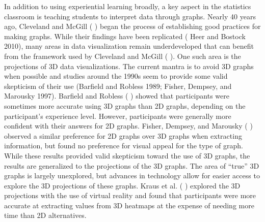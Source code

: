 \documentclass[
  12pt,
]{article}
\providecommand{\DIFdel}[1]{} %
\providecommand{\DIFadd}[1]{{\protect\color{blue} \sf #1}} %
\providecommand{\DIFdel}[1]{{\protect\color{red} [..\footnote{removed: #1} ]}} %
\providecommand{\DIFaddbegin}{} %
\providecommand{\DIFaddend}{} %
\providecommand{\DIFdelbegin}{} %
\providecommand{\DIFdelend}{} %
\newcommand{\DIFscaledelfig}{0.5}
\newlength{\DIFdelgraphicswidth} %
\newlength{\DIFdelgraphicsheight} %
\newcommand{\DIFaddincludegraphics}[2][]{{\color{blue}\fbox{\DIFOincludegraphics[#1]{#2}}}} %
\newcommand{\DIFdelincludegraphics}[2][]{%
\sbox{\DIFdelgraphicsbox}{\DIFOincludegraphics[#1]{#2}}%
\settoboxwidth{\DIFdelgraphicswidth}{\DIFdelgraphicsbox} %
\settoboxtotalheight{\DIFdelgraphicsheight}{\DIFdelgraphicsbox} %
\scalebox{\DIFscaledelfig}{%
\parbox[b]{\DIFdelgraphicswidth}{\usebox{\DIFdelgraphicsbox}\\[-\baselineskip] \rule{\DIFdelgraphicswidth}{0em}}\llap{\resizebox{\DIFdelgraphicswidth}{\DIFdelgraphicsheight}{%
\setlength{\unitlength}{\DIFdelgraphicswidth}%
\begin{picture}(1,1)%
\thicklines\linethickness{2pt} %
{\color[rgb]{1,0,0}\put(0,0){\framebox(1,1){}}}%
{\color[rgb]{1,0,0}\put(0,0){\line( 1,1){1}}}%
{\color[rgb]{1,0,0}\put(0,1){\line(1,-1){1}}}%
\end{picture}%
}\hspace*{3pt}}} %
} %
\DeclareRobustCommand{\DIFaddbegin}{\DIFOaddbegin \let\includegraphics\DIFaddincludegraphics} %
\DeclareRobustCommand{\DIFaddend}{\DIFOaddend \let\includegraphics\DIFOincludegraphics} %
\DeclareRobustCommand{\DIFdelbegin}{\DIFOdelbegin \let\includegraphics\DIFdelincludegraphics} %
\DeclareRobustCommand{\DIFdelend}{\DIFOaddend \let\includegraphics\DIFOincludegraphics} %
\begin{document}
In addition to using experiential learning broadly, a key aspect in the
statistics classroom is teaching students to interpret data through
graphs. Nearly 40 years ago, Cleveland and McGill (\DIFdelbegin \DIFdel{\mbox{%
\citeproc{ref-cleveland1984}{1984}}\hskip0pt%
}\DIFdelend \DIFaddbegin \DIFadd{1984}\DIFaddend ) began the
process of establishing good practices for making graphs. While their
findings have been replicated (\DIFdelbegin \DIFdel{\mbox{%
\citeproc{ref-heer2010}{Heer and Bostock 2010}}\hskip0pt%
}\DIFdelend \DIFaddbegin \DIFadd{Heer and Bostock 2010}\DIFaddend ), many areas in
data visualization remain underdeveloped that can benefit from the
framework used by Cleveland and McGill (\DIFdelbegin \DIFdel{\mbox{%
\citeproc{ref-cleveland1984}{1984}}\hskip0pt%
}\DIFdelend \DIFaddbegin \DIFadd{1984}\DIFaddend ). One such area is the
projections of 3D data visualizations. The current mantra is to avoid 3D
graphs when possible and studies around the 1990s \DIFdelbegin \DIFdel{(\mbox{%
\citeproc{ref-barfield1989}{Barfield and Robless 1989}}\hskip0pt%
;
\mbox{%
\citeproc{ref-fisher1997}{Fisher, Dempsey, and Marousky 1997}}\hskip0pt%
) }\DIFdelend seem to provide some
valid skepticism of their use \DIFaddbegin \DIFadd{(Barfield and Robless 1989; Fisher,
Dempsey, and Marousky 1997)}\DIFaddend . Barfield and Robless (\DIFdelbegin \DIFdel{\mbox{%
\citeproc{ref-barfield1989}{1989}}\hskip0pt%
}\DIFdelend \DIFaddbegin \DIFadd{1989}\DIFaddend ) showed that
participants were sometimes more accurate using 3D graphs than 2D
graphs, depending on the participant's experience level. However,
participants were generally more confident with their answers for 2D
graphs. Fisher, Dempsey, and Marousky (\DIFdelbegin \DIFdel{\mbox{%
\citeproc{ref-fisher1997}{1997}}\hskip0pt%
}\DIFdelend \DIFaddbegin \DIFadd{1997}\DIFaddend ) observed a similar
preference for 2D graphs over 3D graphs when extracting information, but
found no preference for visual appeal for the type of graph. While these
results provided valid skepticism toward the use of 3D graphs, the
results are generalized to the projections of the 3D graphs. The area of
``true'' 3D graphs is largely unexplored, but advances in technology
allow for easier access to explore the 3D projections of these graphs.
Kraus et al. (\DIFdelbegin \DIFdel{\mbox{%
\citeproc{ref-kraus2020}{2020}}\hskip0pt%
}\DIFdelend \DIFaddbegin \DIFadd{2020}\DIFaddend ) explored the 3D projections with the use of virtual
reality and found that participants were more accurate at extracting
values from 3D heatmaps at the expense of needing more time than 2D
alternatives.
\end{document}
